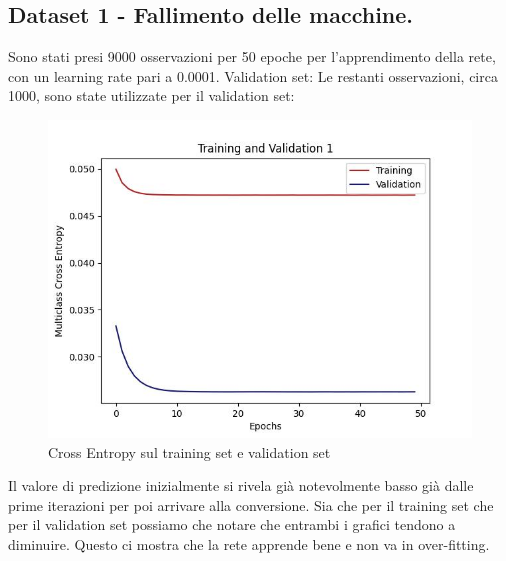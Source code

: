 \documentclass{article}
\begin{document}
        \subsection{Dataset 1 - Fallimento delle macchine.}\label{subsec:dataset-1}
            Sono stati presi 9000 osservazioni per 50 epoche per l'apprendimento della rete, con un learning rate pari a 0.0001.
            Validation set: Le restanti osservazioni, circa 1000, sono state utilizzate per il validation set:
            \begin{figure}[H]
                \centering
                \includegraphics[scale=0.50]{lossval1}
                \caption{Cross Entropy sul training set e validation set}
                \label{fig:figure3}
            \end{figure}
            Il valore di predizione inizialmente si rivela già notevolmente basso già dalle prime iterazioni per poi arrivare alla conversione.
            Sia che per il training set che per il validation set possiamo che notare che entrambi i grafici tendono a diminuire.
            Questo ci mostra che la rete apprende bene e non va in over-fitting.
\end{document}

